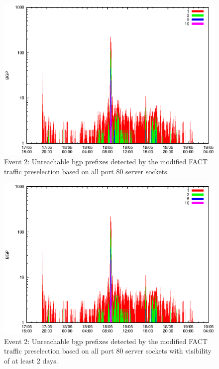 \begin{figure}
	[p] \centering 
	\includegraphics[width=0.75\linewidth]{images/events/2010_05_18/bgp_log_allPort80SES.eps} \caption{Event 2: Unreachable \gls{bgp} prefixes detected by the modified \gls{FACT} traffic preselection based on all port 80 \glspl{server socket}.} 
	\label{fig:TIER1_FACT_allSES80} 
\end{figure}
\begin{figure}
	[p] \centering 
	\includegraphics[width=0.75\linewidth]{images/events/2010_05_18/bgp_log_port80_Set_stab_0_vts_2.eps} \caption{Event 2: Unreachable \gls{bgp} prefixes detected by the modified \gls{FACT} traffic preselection based on all port 80 \glspl{server socket} with visibility of at least 2 days.} 
	\label{fig:TIER1_FACT_allSES80VTS2} 
\end{figure}
